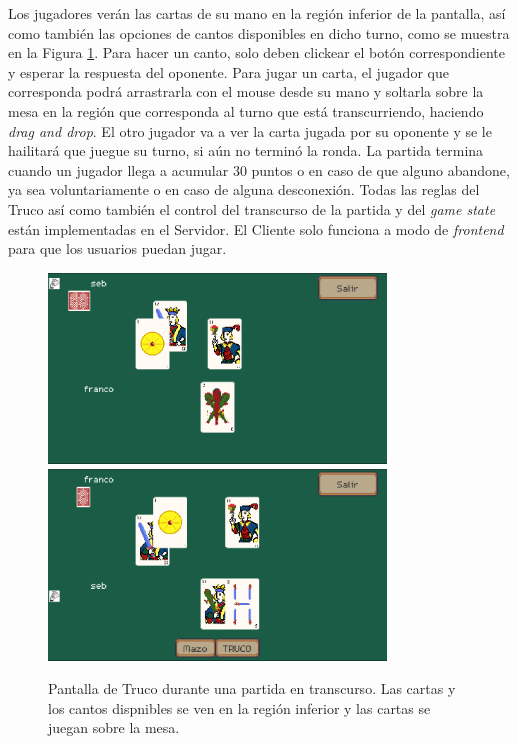 Los jugadores verán las cartas de su mano en la región inferior de la pantalla, así como también las opciones
de cantos disponibles en dicho turno, como se muestra en la Figura \ref{fig:truco-game}.
Para hacer un canto, solo deben clickear el botón correspondiente
y esperar la respuesta del oponente. Para jugar un carta, el jugador que corresponda podrá arrastrarla con el
mouse desde su mano y soltarla sobre la mesa en la región que corresponda al turno que está transcurriendo,
haciendo \textit{drag and drop}. El otro jugador va a ver la carta jugada por su oponente y se le hailitará
que juegue su turno, si aún no terminó la ronda.
La partida termina cuando un jugador llega a acumular 30 puntos o en caso de que alguno abandone, ya sea 
voluntariamente o en caso de alguna desconexión.
Todas las reglas del Truco así como también el control del transcurso de la partida y del \textit{game state}
están implementadas en el Servidor. El Cliente solo funciona a modo de \textit{frontend} para que los
usuarios puedan jugar.

\begin{figure}[htbp]
    \centering
    \includegraphics[width=0.8\textwidth]{../assets/godot-truco-1.png}
    \includegraphics[width=0.8\textwidth]{../assets/godot-truco-2.png}
    \caption{Pantalla de Truco durante una partida en transcurso. Las cartas y los cantos dispnibles se
            ven en la región inferior y las cartas se juegan sobre la mesa.}
    \label{fig:truco-game}
\end{figure}
 
